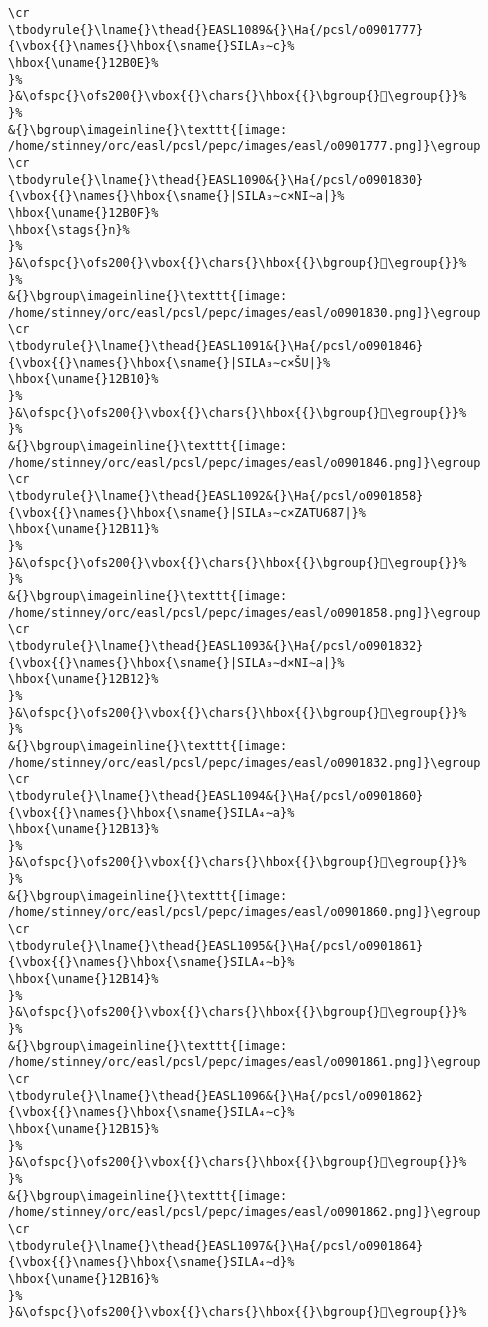 \begin{verbatim}
\cr
\tbodyrule{}\lname{}\thead{}EASL1089&{}\Ha{/pcsl/o0901777}{\vbox{{}\names{}\hbox{\sname{}SILA₃∼c}%
\hbox{\uname{}12B0E}%
}%
}&\ofspc{}\ofs200{}\vbox{{}\chars{}\hbox{{}\bgroup{}𒬎\egroup{}}%
}%
&{}\bgroup\imageinline{}\texttt{[image: /home/stinney/orc/easl/pcsl/pepc/images/easl/o0901777.png]}\egroup
\cr
\tbodyrule{}\lname{}\thead{}EASL1090&{}\Ha{/pcsl/o0901830}{\vbox{{}\names{}\hbox{\sname{}|SILA₃∼c×NI∼a|}%
\hbox{\uname{}12B0F}%
\hbox{\stags{}n}%
}%
}&\ofspc{}\ofs200{}\vbox{{}\chars{}\hbox{{}\bgroup{}𒬏\egroup{}}%
}%
&{}\bgroup\imageinline{}\texttt{[image: /home/stinney/orc/easl/pcsl/pepc/images/easl/o0901830.png]}\egroup
\cr
\tbodyrule{}\lname{}\thead{}EASL1091&{}\Ha{/pcsl/o0901846}{\vbox{{}\names{}\hbox{\sname{}|SILA₃∼c×ŠU|}%
\hbox{\uname{}12B10}%
}%
}&\ofspc{}\ofs200{}\vbox{{}\chars{}\hbox{{}\bgroup{}𒬐\egroup{}}%
}%
&{}\bgroup\imageinline{}\texttt{[image: /home/stinney/orc/easl/pcsl/pepc/images/easl/o0901846.png]}\egroup
\cr
\tbodyrule{}\lname{}\thead{}EASL1092&{}\Ha{/pcsl/o0901858}{\vbox{{}\names{}\hbox{\sname{}|SILA₃∼c×ZATU687|}%
\hbox{\uname{}12B11}%
}%
}&\ofspc{}\ofs200{}\vbox{{}\chars{}\hbox{{}\bgroup{}𒬑\egroup{}}%
}%
&{}\bgroup\imageinline{}\texttt{[image: /home/stinney/orc/easl/pcsl/pepc/images/easl/o0901858.png]}\egroup
\cr
\tbodyrule{}\lname{}\thead{}EASL1093&{}\Ha{/pcsl/o0901832}{\vbox{{}\names{}\hbox{\sname{}|SILA₃∼d×NI∼a|}%
\hbox{\uname{}12B12}%
}%
}&\ofspc{}\ofs200{}\vbox{{}\chars{}\hbox{{}\bgroup{}𒬒\egroup{}}%
}%
&{}\bgroup\imageinline{}\texttt{[image: /home/stinney/orc/easl/pcsl/pepc/images/easl/o0901832.png]}\egroup
\cr
\tbodyrule{}\lname{}\thead{}EASL1094&{}\Ha{/pcsl/o0901860}{\vbox{{}\names{}\hbox{\sname{}SILA₄∼a}%
\hbox{\uname{}12B13}%
}%
}&\ofspc{}\ofs200{}\vbox{{}\chars{}\hbox{{}\bgroup{}𒬓\egroup{}}%
}%
&{}\bgroup\imageinline{}\texttt{[image: /home/stinney/orc/easl/pcsl/pepc/images/easl/o0901860.png]}\egroup
\cr
\tbodyrule{}\lname{}\thead{}EASL1095&{}\Ha{/pcsl/o0901861}{\vbox{{}\names{}\hbox{\sname{}SILA₄∼b}%
\hbox{\uname{}12B14}%
}%
}&\ofspc{}\ofs200{}\vbox{{}\chars{}\hbox{{}\bgroup{}𒬔\egroup{}}%
}%
&{}\bgroup\imageinline{}\texttt{[image: /home/stinney/orc/easl/pcsl/pepc/images/easl/o0901861.png]}\egroup
\cr
\tbodyrule{}\lname{}\thead{}EASL1096&{}\Ha{/pcsl/o0901862}{\vbox{{}\names{}\hbox{\sname{}SILA₄∼c}%
\hbox{\uname{}12B15}%
}%
}&\ofspc{}\ofs200{}\vbox{{}\chars{}\hbox{{}\bgroup{}𒬕\egroup{}}%
}%
&{}\bgroup\imageinline{}\texttt{[image: /home/stinney/orc/easl/pcsl/pepc/images/easl/o0901862.png]}\egroup
\cr
\tbodyrule{}\lname{}\thead{}EASL1097&{}\Ha{/pcsl/o0901864}{\vbox{{}\names{}\hbox{\sname{}SILA₄∼d}%
\hbox{\uname{}12B16}%
}%
}&\ofspc{}\ofs200{}\vbox{{}\chars{}\hbox{{}\bgroup{}𒬖\egroup{}}%

\end{verbatim}
